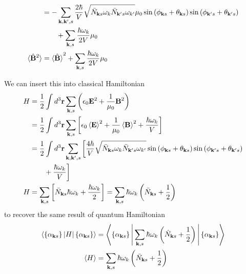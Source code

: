 \documentclass[../../../main.tex]{subfiles}
\begin{document}
\begin{align*}
   & =   - \sum_{\mathbf{k},\mathbf{k}',s} \frac{2\hbar }{ V}\sqrt{\bar{N}_{\mathbf{k }s}\omega_k \bar{N}_{\mathbf{k}' s}\omega_{k'}}\mu_0
  \sin \left( \phi_{\mathbf{k }s}+\theta_{\mathbf{k}s} \right)
  \sin \left( \phi_{\mathbf{k }'s}+\theta_{\mathbf{k}'s} \right)                                                                                                                                         \\
   & \qquad+ \sum_{\mathbf{k },s}\frac{\hbar \omega_k }{2V}\mu_0                                                                                                                                         \\
  \braket{  \hat{\mathbf{B}}^2 }
   & = \braket{\hat{\mathbf{B}} }^2+\sum_{\mathbf{k },s}\frac{\hbar \omega_k }{2V}\mu_0
\end{align*}

We can insert this into classical Hamiltonian
\begin{align*}
  H & =   \frac{1}{ 2}\int d^3 \mathbf{r} \sum_{\mathbf{k},s} \left( \epsilon_0\mathbf{E}^2 + \frac{1}{\mu_0} \mathbf{B}^2 \right)                                                                 \\
    & = \frac{1 }{2} \int d^3 \mathbf{r } \sum_{\mathbf{k},s} \left[ \epsilon_0\braket{\mathbf{E} }^2+ \frac{1 }{\mu_0}\braket{\mathbf{B} }^2 +\frac{\hbar \omega_k }{V}\right]                    \\
    & = \frac{1 }{2} \int d^3 \mathbf{r } \sum_{\mathbf{k},\mathbf{k}', s} \bigg[ \frac{4\hbar }{V}\sqrt{\bar{N}_{\mathbf{k }s}\omega_k \bar{N}_{\mathbf{k}' s}\omega_{k'}}
    \sin \left( \phi_{\mathbf{k }s}+\theta_{\mathbf{k}s} \right)
  \sin \left( \phi_{\mathbf{k }'s}+\theta_{\mathbf{k}'s} \right)                                                                                                                                   \\
    & \qquad+\frac{\hbar \omega_k }{V}\bigg]                                                                                                                                                       \\
  H & = \sum_{\mathbf{k },s}\left[ \bar{N }_{\mathbf{k }s}\hbar \omega_k+\frac{\hbar \omega_k }{2} \right]=  \sum_{\mathbf{k},s} \hbar \omega_k \left( \bar{N}_{\mathbf{k }s}+\frac{1 }{2} \right)
\end{align*}
to recover the same result of quantum Hamiltonian
\begin{align*}
  \braket{\left\{ \alpha_{\mathbf{k }s} \right\} |H|\left\{ \alpha_{\mathbf{k }s} \right\} }
   & =
  \left\langle \left\{ \alpha_{\mathbf{k }s} \right\} \Bigg| \sum_{\mathbf{k},s} \hbar \omega_k \left( \hat{N }_{\mathbf{k} s }+ \frac{1 }{2} \right)\Bigg|\left\{ \alpha_{\mathbf{k }s} \right\}  \right\rangle \\
  \braket{H}
   & =  \sum_{\mathbf{k},s} \hbar \omega_k \left( \bar{N}_{\mathbf{k }s} +\frac{1 }{2} \right)
\end{align*}
\end{document}
